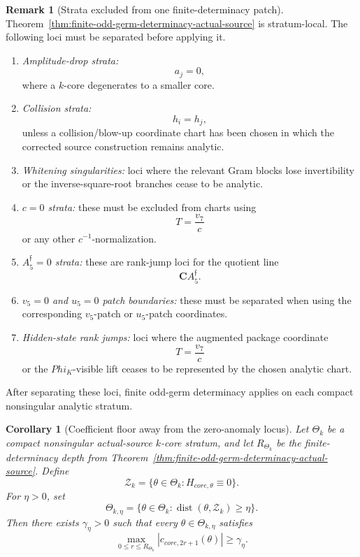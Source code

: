 \documentclass[11pt,a4paper]{amsart}
\def\Phi{Phi}%
\def\core{core}%
\theoremstyle{plain}
\newtheorem{corollary}[theorem]{Corollary}
\theoremstyle{definition}
\newtheorem{remark}[theorem]{Remark}
\newcommand{\core}{\mathrm{core}}
\begin{document}
\begin{remark}[Strata excluded from one finite-determinacy patch]
\label{rem:finite-determinacy-excluded-strata}
Theorem~\ref{thm:finite-odd-germ-determinacy-actual-source} is stratum-local.
The following loci must be separated before applying it.

\begin{enumerate}
\item \emph{Amplitude-drop strata:}
\[
a_j=0,
\]
where a \(k\)-core degenerates to a smaller core.

\item \emph{Collision strata:}
\[
h_i=h_j,
\]
unless a collision/blow-up coordinate chart has been chosen in which the
corrected source construction remains analytic.

\item \emph{Whitening singularities:} loci where the relevant Gram blocks lose
invertibility or the inverse-square-root branches cease to be analytic.

\item \emph{\(c=0\) strata:} these must be excluded from charts using
\[
T=\frac{v_7}{c}
\]
or any other \(c^{-1}\)-normalization.

\item \emph{\(A_5^{\mathfrak f}=0\) strata:} these are rank-jump loci for the
quotient line
\[
\mathbf C A_5^{\mathfrak f}.
\]

\item \emph{\(v_5=0\) and \(u_5=0\) patch boundaries:} these must be separated
when using the corresponding \(v_5\)-patch or \(u_5\)-patch coordinates.

\item \emph{Hidden-state rank jumps:} loci where the augmented package
coordinate
\[
T=\frac{v_7}{c}
\]
or the \(\Phi_K\)-visible lift ceases to be represented by the chosen analytic
chart.
\end{enumerate}

After separating these loci, finite odd-germ determinacy applies on each
compact nonsingular analytic stratum.
\end{remark}

\begin{corollary}[Coefficient floor away from the zero-anomaly locus]
\label{cor:coefficient-floor-away-from-zero-anomaly}
Let \(\Theta_k\) be a compact nonsingular actual-source \(k\)-core stratum, and
let \(R_{\Theta_k}\) be the finite-determinacy depth from
Theorem~\ref{thm:finite-odd-germ-determinacy-actual-source}.  Define
\[
\mathcal Z_k
=
\{\theta\in\Theta_k:H_{\core,\theta}\equiv0\}.
\]
For \(\eta>0\), set
\[
\Theta_{k,\eta}
=
\{\theta\in\Theta_k:
\operatorname{dist}(\theta,\mathcal Z_k)\ge\eta\}.
\]
Then there exists \(\gamma_\eta>0\) such that every
\(\theta\in\Theta_{k,\eta}\) satisfies
\[
\max_{0\le r\le R_{\Theta_k}}
|c_{\core,2r+1}(\theta)|
\ge
\gamma_\eta.
\]
\end{corollary}
\end{document}
